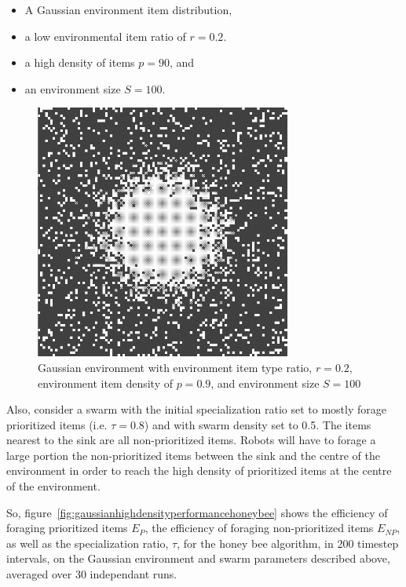 \begin{itemize}
\item A Gaussian environment item distribution,
\item a low environmental item ratio of $r=0.2$.
\item a high density of items $p=90$, and
\item an environment size $S=100$.
\end{itemize}

\begin{figure}[!htb]
\centering
\includegraphics[width=0.75\textwidth]{chapters/chapter6/figures/flexibility-gaussian-obj90-ratio.PNG}
\caption{Gaussian environment with environment item type ratio, $r=0.2$, environment item density of $p=0.9$, and environment size $S=100$}
\label{fig:gaussianhighdensityenv}
\end{figure}

Also, consider a swarm with the initial specialization ratio set to mostly forage prioritized items (i.e. $\tau=0.8$) and with swarm density set to 0.5. The items nearest to the sink are all non-prioritized items. Robots will have to forage a large portion the non-prioritized items between the sink and the centre of the environment in order to reach the high density of prioritized items at the centre of the environment. 


So, figure~\ref{fig:gaussianhighdensityperformancehoneybee} shows the efficiency of foraging prioritized items $E_P$, the efficiency of foraging non-prioritized items $E_{NP}$, as well as the specialization ratio, $\tau$, for the honey bee algorithm, in 200 timestep intervals, on the Gaussian environment and swarm parameters described above, averaged over 30 independant runs.


